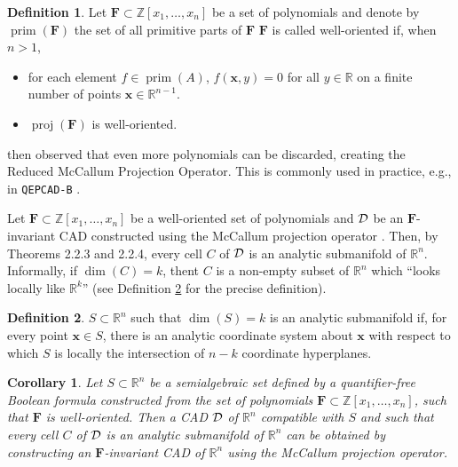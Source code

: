 \documentclass[
]{book}
\newtheorem{corollary}{Corollary}[chapter]
\theoremstyle{definition}
\newtheorem{definition}{Definition}[chapter]
\theoremstyle{definition}
\theoremstyle{definition}
\theoremstyle{definition}
\theoremstyle{remark}
\begin{document}
\begin{definition}

\citep[6.1]{mccallum1998}
Let \(\mathbf{F} \subset \mathbb{Z}[x_1, \ldots, x_n]\) be a set of polynomials and denote by \(\operatorname{prim}(\mathbf{F})\) the set of all primitive parts of \(\mathbf{F}\)
\(\mathbf{F}\) is called well-oriented if, when \(n > 1\),

\begin{itemize}
\item
  for each element \(f \in \operatorname{prim}(A)\), \(f(\mathbf{x},y) = 0\) for all \(y\in \mathbb{R}\) on a finite number of points \(\mathbf{x} \in \mathbb{R}^{n-1}\). \citep[condition WO1]{mccallum1998}
\item
  \(\operatorname{proj}(\mathbf{F})\) is well-oriented. \citep[condition WO2]{mccallum1998}
\end{itemize}

\end{definition}

\citet{brown2001} then observed that even more polynomials can be discarded, creating the Reduced McCallum Projection Operator. This is commonly used in practice, e.g., in \texttt{QEPCAD-B} \citep{brownQepcad}.

Let \(\mathbf{F} \subset \mathbb{Z}[x_1,\ldots,x_n]\) be a well-oriented set of polynomials and \(\cal D\) be an \(\mathbf{F}\)-invariant CAD constructed using the McCallum projection operator \citep{mccallum1998}. Then, by \citet{mccallum1988} Theorems 2.2.3 and 2.2.4, every cell \(C\) of \(\cal D\) is an analytic submanifold of \(\mathbb{R}^n\). Informally, if \(\dim(C) = k\), thent \(C\) is a non-empty subset of \(\mathbb{R}^n\) which ``looks locally like \(\mathbb{R}^k\)'' (see Definition \ref{def:analytic-submanifold} for the precise definition).

\begin{definition}
\protect\hypertarget{def:analytic-submanifold}{}\label{def:analytic-submanifold}\(S \subset \mathbb{R}^n\) such that \(\dim(S) = k\) is an analytic submanifold if, for every point \(\mathbf{x} \in S\), there is an analytic coordinate system about \(\mathbf{x}\) with respect to which \(S\) is locally the intersection of \(n-k\) coordinate hyperplanes.
\end{definition}

\begin{corollary}
\protect\hypertarget{cor:mc-smooth}{}\label{cor:mc-smooth}Let \(S \subset \mathbb{R}^n\) be a semialgebraic set defined by a quantifier-free Boolean formula constructed from the set of polynomials \(\mathbf{F} \subset \mathbb{Z}[x_1,\ldots,x_n]\), such that \(\mathbf{F}\) is well-oriented.
Then a CAD \(\cal D\) of \(\mathbb{R}^n\) compatible with \(S\) and such that every cell \(C\) of \(\cal D\) is an analytic submanifold of \(\mathbb{R}^n\) can be obtained by constructing an \(\mathbf{F}\)-invariant CAD of \(\mathbb{R}^n\) using the McCallum projection operator.
\end{corollary}
\end{document}
